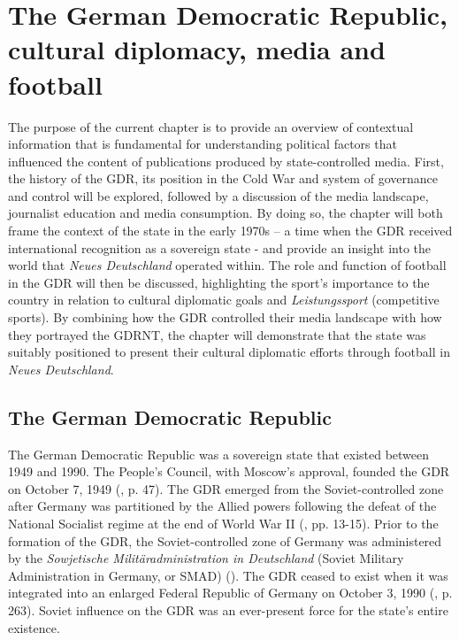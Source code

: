 \chapter{The German Democratic Republic, cultural diplomacy, media and football\label{cha:background}}

The purpose of the current chapter is to provide an overview of contextual information that is fundamental for understanding political factors that influenced the content of publications produced by state-controlled media. First, the history of the GDR, its position in the Cold War and system of governance and control will be explored, followed by a discussion of the media landscape, journalist education and media consumption. By doing so, the chapter will both frame the context of the state in the early 1970s – a time when the GDR received international recognition as a sovereign state - and provide an insight into the world that \textit{Neues Deutschland} operated within. The role and function of football in the GDR will then be discussed, highlighting the sport’s importance to the country in relation to cultural diplomatic goals and \textit{Leistungssport} (competitive sports). By combining how the GDR controlled their media landscape with how they portrayed the GDRNT, the chapter will demonstrate that the state was suitably positioned to present their cultural diplomatic efforts through football in \textit{Neues Deutschland}.

\section*{The German Democratic Republic}

The German Democratic Republic was a sovereign state that existed between 1949 and 1990. The People’s Council, with Moscow's approval, founded the GDR on October 7, 1949 (\cite{dennis2000}, p. 47). The GDR emerged from the Soviet-controlled zone after Germany was partitioned by the Allied powers following the defeat of the National Socialist regime at the end of World War II (\cite{dennis2000}, pp. 13-15). Prior to the formation of the GDR, the Soviet-controlled zone of Germany was administered by the \textit{Sowjetische Militäradministration in Deutschland} (Soviet Military Administration in Germany, or SMAD) (\cite{foitzik2009}). The GDR ceased to exist when it was integrated into an enlarged Federal Republic of Germany on October 3, 1990 (\cite{fullbrook1995}, p. 263). Soviet influence on the GDR was an ever-present force for the state’s entire existence.

